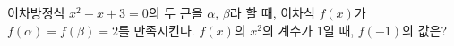 이차방정식 $x^2-x+3=0$의 두 근을 $\alpha$, $\beta$라 할 때, 이차식 $f(x)$가 $f(\alpha)=f(\beta)=2$를 만족시킨다. $f(x)$의 $x^2$의 계수가 $1$일 때, $f(-1)$의 값은?
